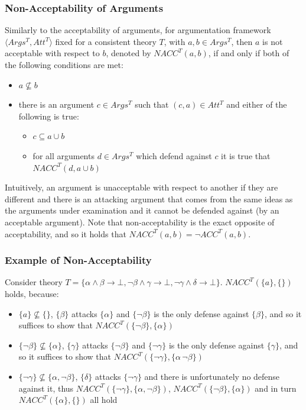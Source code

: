 \documentclass[11pt,twoside,a4paper]{report}
\begin{document}
\subsubsection{Non-Acceptability of Arguments}
\label{subsec:nacc}
Similarly to the acceptability of arguments, for argumentation framework $\langle Args^T, Att^T\rangle$ fixed for a consistent theory $T$, with $a,b\in Args^T$, then $a$ is not acceptable with respect to $b$, denoted by $NACC^T(a,b)$, if and only if both of the following conditions are met:
\begin{itemize}
\item
$a\nsubseteq b$
\item
there is an argument $c\in Args^T$ such that $(c,a)\in Att^T$ and either of the following is true:
\begin{itemize}
\item
$c\subseteq a\cup b$
\item
for all arguments $d\in Args^T$ which defend against $c$ it is true that $NACC^T(d,a\cup b)$
\end{itemize}
\end{itemize}

Intuitively, an argument is unacceptable with respect to another if they are different and there is an attacking argument that comes from the same ideas as the arguments under examination and it cannot be defended against (by an acceptable argument). Note that non-acceptability is the exact opposite of acceptability, and so it holds that $NACC^T(a,b) = \neg ACC^T(a,b)$.

\subsubsection{Example of Non-Acceptability}
Consider theory $T = \{\alpha\wedge\beta\rightarrow\bot, \neg\beta\wedge\gamma\rightarrow\bot, \neg\gamma\wedge\delta\rightarrow\bot\}$. $NACC^T(\{a\},\{\})$ holds, because:
\begin{itemize}
\item
$\{a\}\nsubseteq\{\}$, $\{\beta\}$ attacks $\{\alpha\}$ and $\{\neg\beta\}$ is the only defense against $\{\beta\}$, and so it suffices to show that $NACC^T(\{\neg\beta\}, \{\alpha\})$
\item
$\{\neg\beta\}\nsubseteq\{\alpha\}$, $\{\gamma\}$ attacks $\{\neg\beta\}$ and $\{\neg\gamma\}$ is the only defense against $\{\gamma\}$, and so it suffices to show that $NACC^T(\{\neg\gamma\}, \{\alpha\, \neg\beta\})$
\item
$\{\neg\gamma\}\nsubseteq\{\alpha, \neg\beta\}$, $\{\delta\}$ attacks $\{\neg\gamma\}$ and there is unfortunately no defense against it, thus $NACC^T(\{\neg\gamma\}, \{\alpha,\neg\beta\})$, $NACC^T(\{\neg\beta\}, \{\alpha\})$ and in turn $NACC^T(\{\alpha\}, \{\})$ all hold
\end{itemize}
\end{document}
